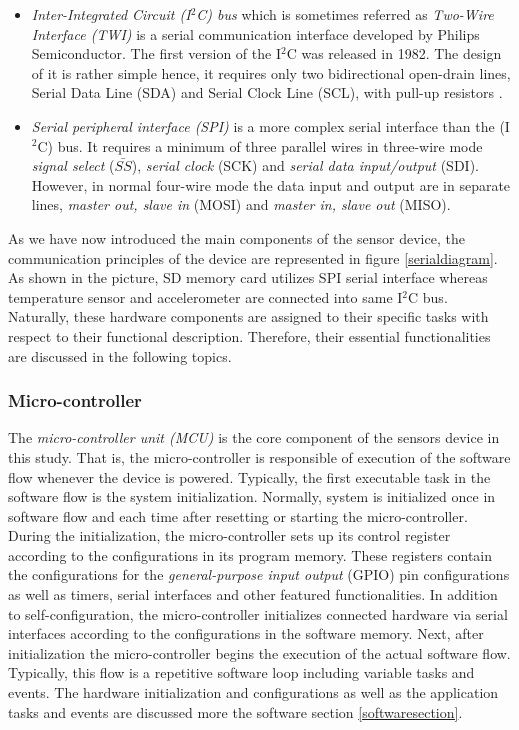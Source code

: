 \documentclass[english,12pt,a4paper,pdftex,elec,utf8]{aaltothesis}
\begin{document}
\begin{itemize}
\item \textit{Inter-Integrated Circuit (I$^2$C) bus} which is sometimes referred as \textit{Two-Wire Interface (TWI)} is a serial communication interface developed by Philips Semiconductor. The first version of  the I$^2$C was released in 1982. The design of it is rather simple hence, it requires only two bidirectional open-drain lines, Serial Data Line (SDA) and Serial Clock Line (SCL), with pull-up resistors \cite{i2cmanual}.


\item \textit{Serial peripheral interface (SPI)} \cite{spimanual} is a more complex serial interface than the (I$^2$C) bus. It requires a minimum of three parallel wires in three-wire mode \cite{bma222datasheet} \textit{signal select} ($\bar{SS}$), \textit{serial clock} (SCK) and \textit{serial data input/output} (SDI). However, in normal four-wire mode the data input and output are in separate lines, \textit{master out, slave in} (MOSI) and \textit{master in, slave out} (MISO).
\end{itemize} 
As we have now introduced the main components of the sensor device, the communication principles of the device are represented in figure \ref{serialdiagram}. As shown in the picture, SD memory card utilizes SPI serial interface whereas temperature sensor and accelerometer are connected into same I$^2$C bus. Naturally, these hardware components are assigned to their specific tasks with respect to their functional description. Therefore, their essential functionalities are discussed in the following topics.



\subsubsection*{Micro-controller}

The \textit{micro-controller unit (MCU)} is the core component of the sensors device in this study. That is, the micro-controller is responsible of execution of the software flow whenever the device is powered. Typically, the first executable task in the software flow is the system initialization. Normally, system is initialized once in software flow and each time after resetting or starting the micro-controller. During the initialization, the micro-controller sets up its control register according to the configurations in its program memory. These registers contain the configurations for the \textit{general-purpose input output} (GPIO) pin configurations as well as timers, serial interfaces and other featured functionalities. In addition to self-configuration, the micro-controller initializes connected hardware via serial interfaces according to the configurations in the software memory. Next, after initialization the micro-controller begins the execution of the actual software flow. Typically, this flow is a repetitive software loop including variable tasks and events. The hardware initialization and configurations as well as the application tasks and events are discussed more the software section \ref{softwaresection}.
\end{document}
